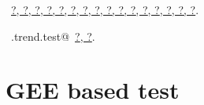 \documentclass[reqno]{amsart}
\renewcommand{\NWlink}[2]{\hyperlink{#1}{#2}}
\begin{document}
\begin{flushleft}
\vspace{-1.5ex}
\footnotesize
\begin{list}{}{\setlength{\itemsep}{-\parsep}\setlength{\itemindent}{-\leftmargin}}
\item \NWtxtFileDefBy\ \NWlink{nuweb?}{?}\NWlink{nuweb?}{, ?}\NWlink{nuweb?}{, ?}\NWlink{nuweb?}{, ?}\NWlink{nuweb?}{, ?}\NWlink{nuweb?}{, ?}\NWlink{nuweb?}{, ?}\NWlink{nuweb?}{, ?}\NWlink{nuweb?}{, ?}\NWlink{nuweb?}{, ?}\NWlink{nuweb?}{, ?}\NWlink{nuweb?}{, ?}\NWlink{nuweb?}{, ?}\NWlink{nuweb?}{, ?}\NWlink{nuweb?}{, ?}\NWlink{nuweb?}{, ?}.
\item \NWtxtIdentsDefed\nobreak\  \verb@RS.trend.test@\nobreak\ \NWlink{nuweb?}{?}\NWlink{nuweb?}{, ?}.
\item{}
\end{list}
\vspace{4ex}
\end{flushleft}
\section{GEE based test}
\end{document}
